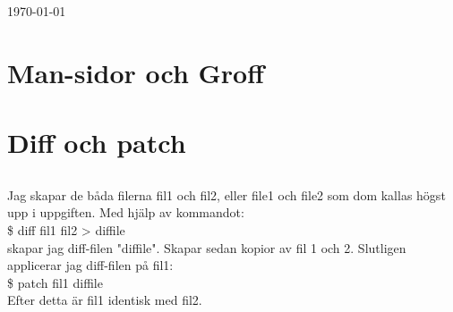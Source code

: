 \documentclass[11pt]{article}
\begin{document}
\begin{titlepage}


	\vfill\vfill\vfill %

	{\large\today} %




	\vfill %

\end{titlepage}


\section{Man-sidor och Groff}

\section{Diff och patch}

\subsection{  }
Jag skapar de båda filerna fil1 och fil2, eller file1 och file2 som dom kallas högst upp i uppgiften. Med hjälp av kommandot:\\ 
\$ diff fil1 fil2 > diffile\\
skapar jag diff-filen "diffile". Skapar sedan kopior av fil 1 och 2. Slutligen applicerar jag diff-filen på fil1: \\
\$ patch fil1 diffile\\
Efter detta är fil1 identisk med fil2. 
\subsection{}
\end{document}
